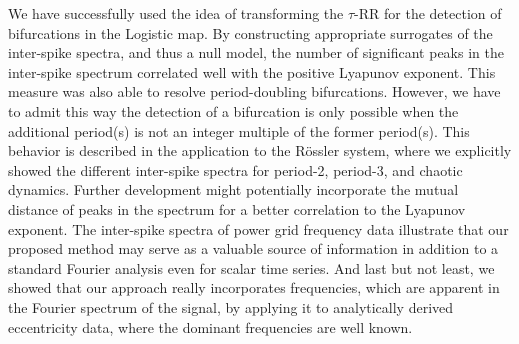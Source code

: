 \documentclass[entropy,article,submit,pdftex,moreauthors]{Definitions/mdpi}
\begin{document}
We have successfully used the idea of transforming the $\tau$-RR for the detection of bifurcations in the Logistic map. By constructing appropriate surrogates of the inter-spike spectra, 
and thus a null model, the number of significant peaks in the inter-spike spectrum correlated well with the positive Lyapunov exponent. This measure was also able to resolve 
period-doubling bifurcations. However, we have to admit this way the detection of a bifurcation is only possible when the additional period(s) is not an integer multiple of the former period(s). 
This behavior is described in the application to the R\"ossler system, where we explicitly showed the different inter-spike spectra for period-2, period-3, and chaotic dynamics.
Further development might potentially incorporate the mutual distance of peaks in the spectrum for a better correlation to the Lyapunov exponent. The inter-spike spectra of power grid 
frequency data illustrate that our proposed method may serve as a valuable source of information in addition to a standard Fourier analysis even for scalar time series. And last but not least, we showed that our approach 
really incorporates frequencies, which are apparent in the Fourier spectrum of the signal, by applying it to analytically derived eccentricity data, where the dominant frequencies are well 
known.
\end{document}
